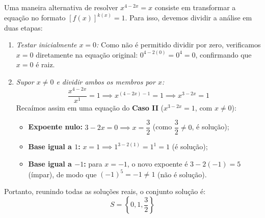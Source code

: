 \documentclass[12pt,a4paper]{report}
\begin{document}
	Uma maneira alternativa de resolver $x^{4 - 2x} = x$ consiste em transformar a equação no formato $[f(x)]^{k(x)} = 1$. Para isso, devemos dividir a análise em duas etapas:
	\begin{enumerate}[label=\alph*)]
		\item \textit{Testar inicialmente $x = 0$:} Como não é permitido dividir por zero, verificamos $x = 0$ diretamente na equação original: $0^{4 - 2(0)} = 0^4 = 0$, confirmando que $x = 0$ é raiz.
		\item \textit{Supor $x \neq 0$ e dividir ambos os membros por $x$:}
		\[
		\frac{x^{4 - 2x}}{x^1} = 1 \implies x^{(4 - 2x) - 1} = 1 \implies x^{3 - 2x} = 1
		\]
		Recaímos assim em uma equação do \textbf{Caso II} ($x^{3 - 2x} = 1$, com $x \neq 0$):
		\begin{itemize}
			\item \textbf{Expoente nulo:} $3 - 2x = 0 \implies x = \dfrac{3}{2}$ (como $\dfrac{3}{2} \neq 0$, é solução);
			\item \textbf{Base igual a $1$:} $x = 1 \implies 1^{3 - 2(1)} = 1^1 = 1$ (é solução);
			\item \textbf{Base igual a $-1$:} para $x = -1$, o novo expoente é $3 - 2(-1) = 5$ (ímpar), de modo que $(-1)^5 = -1 \neq 1$ (não é solução).
		\end{itemize}
	\end{enumerate}
	
	Portanto, reunindo todas as soluções reais, o conjunto solução é:
	\[
	S = \left\{ 0, 1, \frac{3}{2} \right\}
	\]
	
\end{document}
